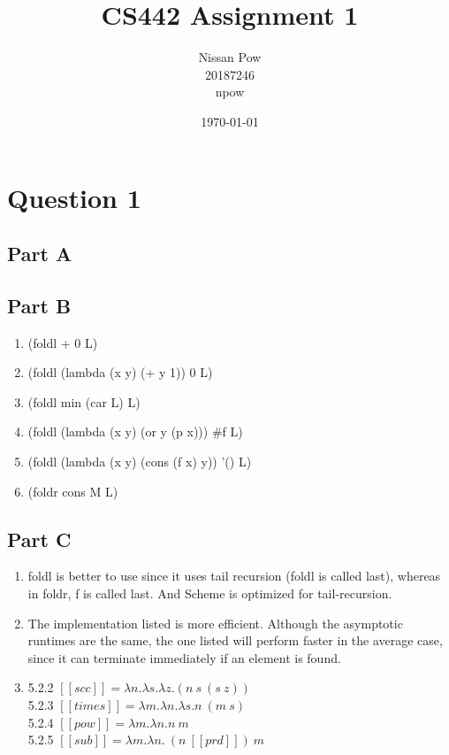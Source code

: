 \documentclass[onecolumn,11pt]{article}
\title{CS442 Assignment 1}
\author{Nissan Pow\\20187246\\npow}
\date{\today}
\newcommand{\sem}[1]{\ensuremath{[\![#1]\!]}}
\begin{document}
\maketitle

\section*{Question 1}

\subsection*{Part A}
\begin{alltt}
\end{alltt}

\subsection*{Part B}
\begin{enumerate}
\item (foldl + 0 L)
\item (foldl (lambda (x y) (+ y 1)) 0 L)
\item (foldl min (car L) L)
\item (foldl (lambda (x y) (or y (p x))) \#f L)
\item (foldl (lambda (x y) (cons (f x) y)) '() L)
\item (foldr cons M L)
\end{enumerate}

\subsection*{Part C}
\begin{enumerate}
\item foldl is better to use since it uses tail recursion (foldl is called last), whereas in foldr, f is called last. And Scheme is optimized for tail-recursion. 

\item The implementation listed is more efficient. Although the asymptotic runtimes are the same, the one listed will perform faster in the average case, since it can terminate immediately if an element is found.

\item 5.2.2 $\sem{scc} = \lambda n. \lambda s. \lambda z. (n\ s\ (s\ z))$ \\
5.2.3 $\sem{times} = \lambda m. \lambda n. \lambda s. n\ (m\ s)$ \\
5.2.4 $\sem{pow} = \lambda m. \lambda n. n\ m$ \\
5.2.5 $\sem{sub} = \lambda m. \lambda n.\ (n\ \sem{prd})\ m$ \\

\end{enumerate}
\end{document}
